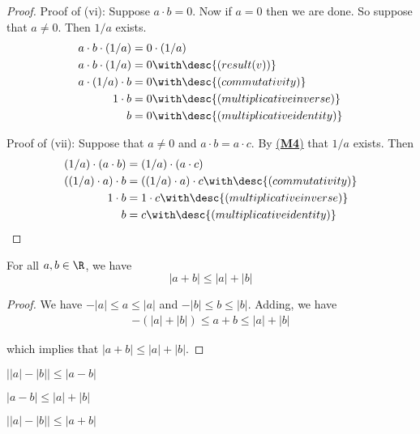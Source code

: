 \begin{proof}
  Proof of (vi): Suppose $a\cdot b=0$. Now if $a=0$ then we are done. So suppose
  that $a\neq0$. Then $1/a$ exists.
  \begin{align*}
    a\cdot b\cdot(1/a) &=0\cdot(1/a)                            \\
    a\cdot b\cdot(1/a) &=0\with\desc{(result (v))}              \\
    a\cdot(1/a)\cdot b &=0\with\desc{(commutativity)}           \\
    1\cdot b           &=0\with\desc{(multiplicative inverse)}  \\
    b                  &=0\with\desc{(multiplicative identity)}
  \end{align*}

  Proof of (vii): Suppose that $a\neq0$ and $a\cdot b=a\cdot c$. By
  \href{bf61f02}{(\textbf{M4})} that $1/a$ exists. Then
  \begin{align*}
    (1/a)\cdot(a\cdot b)  &=(1/a)\cdot(a\cdot c)                             \\
    ((1/a)\cdot a)\cdot b &=((1/a)\cdot a)\cdot c\with\desc{(commutativity)} \\
    1\cdot b              &=1\cdot c\with\desc{(multiplicative inverse)}     \\
    b                     &= c\with\desc{(multiplicative identity)}
  \end{align*}
\end{proof}

\label{f1288ad}

For all $a,b\in\R$, we have
$$
  |a+b|\leq|a|+|b|
$$

\begin{proof}
  We have ${-}|a|\leq a\leq|a|$ and ${-}|b|\leq b\leq|b|$. Adding, we have
  \begin{align*}
    -(|a|+|b|)\leq a+b\leq |a|+|b|
  \end{align*}

  which implies that $|a+b|\leq|a|+|b|$.
\end{proof}

\label{f699f4d}

\begin{enumerati}
  \item $\big||a|-|b|\big|\leq|a-b|$
  \item $|a-b|\leq|a|+|b|$
  \item $\big||a|-|b|\big|\leq|a+b|$
\end{enumerati}

